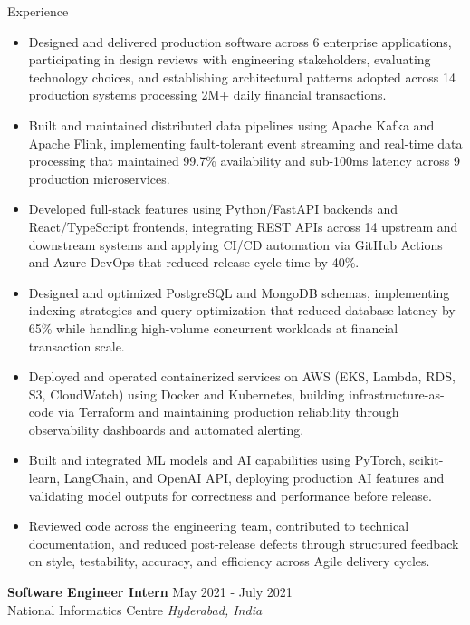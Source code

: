 \documentclass{resume}
\begin{document}
\begin{rSection}{Experience}
\begin{itemize}
\vspace{-2mm}
  \item Designed and delivered production software across 6 enterprise applications, participating in design reviews with engineering stakeholders, evaluating technology choices, and establishing architectural patterns adopted across 14 production systems processing 2M+ daily financial transactions.
\vspace{-2mm}
  \item Built and maintained distributed data pipelines using Apache Kafka and Apache Flink, implementing fault-tolerant event streaming and real-time data processing that maintained 99.7\% availability and sub-100ms latency across 9 production microservices.
\vspace{-2mm}
  \item Developed full-stack features using Python/FastAPI backends and React/TypeScript frontends, integrating REST APIs across 14 upstream and downstream systems and applying CI/CD automation via GitHub Actions and Azure DevOps that reduced release cycle time by 40\%.
\vspace{-2mm}
  \item Designed and optimized PostgreSQL and MongoDB schemas, implementing indexing strategies and query optimization that reduced database latency by 65\% while handling high-volume concurrent workloads at financial transaction scale.
\vspace{-2mm}
  \item Deployed and operated containerized services on AWS (EKS, Lambda, RDS, S3, CloudWatch) using Docker and Kubernetes, building infrastructure-as-code via Terraform and maintaining production reliability through observability dashboards and automated alerting.
\vspace{-2mm}
  \item Built and integrated ML models and AI capabilities using PyTorch, scikit-learn, LangChain, and OpenAI API, deploying production AI features and validating model outputs for correctness and performance before release.
\vspace{-2mm}
  \item Reviewed code across the engineering team, contributed to technical documentation, and reduced post-release defects through structured feedback on style, testability, accuracy, and efficiency across Agile delivery cycles.
\end{itemize}

\textbf{Software Engineer Intern} \hfill May 2021 - July 2021\\
National Informatics Centre \hfill \textit{Hyderabad, India}


\end{rSection}
\end{document}
